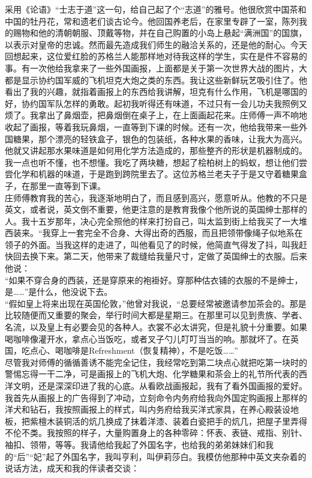 采用《论语》“士志于道”这一句，给自己起了个“志道”的雅号。他很欣赏中国茶和中国的牡丹花，常和遗老们谈古论今。他回国养老后，在家里专辟了一室，陈列我的赐物和他的清朝朝服、顶戴等物，并在自己购置的小岛上悬起“满洲国”的国旗，以表示对皇帝的忠诚。然而最先造成我们师生的融洽关系的，还是他的耐心。今天回想起来，这位爱红脸的苏格兰人能那样地对待我这样的学生，实在是件不容易的事。有一次他给我拿来了一些外国画报，上面都是关于第一次世界大战的图片，大都是显示协约国军威的飞机坦克大炮之类的东西。我让这些新鲜玩艺吸引住了。他看出了我的兴趣，就指着画报上的东西给我讲解，坦克有什么作用，飞机是哪国的好，协约国军队怎样的勇敢。起初我听得还有味道，不过只有一会儿功夫我照例又烦了。我拿出了鼻烟壶，把鼻烟倒在桌子上，在上面画起花来。庄师傅一声不响地收起了画报，等着我玩鼻烟，一直等到下课的时候。还有一次，他给我带来一些外国糖果，那个漂亮的轻铁盒子，银色的包装纸，各种水果的香味，让我大为高兴。他就又讲起那水果味道是如何用化学方法造成的，那些整齐的形状是机器制成的。我一点也听不懂，也不想懂。我吃了两块糖，想起了桧柏树上的蚂蚁，想让他们尝尝化学和机器的味道，于是跑到跨院里去了。这位苏格兰老夫子于是又守着糖果盒子，在那里一直等到下课。\\

庄师傅教育我的苦心，我逐渐地明白了，而且感到高兴，愿意听从。他教的不只是英文，或者说，英文倒不重要，他更注意的是教育我像个他所说的英国绅士那样的人。我十五岁那年，决心完全照他的样来打扮自己，叫太监到街上给我买了一大堆西装来。“我穿上一套完全不合身、大得出奇的西服，而且把领带像绳子似地系在领子的外面。当我这样的走进了，叫他看见了的时候，他简直气得发了抖，叫我赶快回去换下来。第二天，他带来了裁缝给我量尺寸，定做了英国绅士的衣服。后来他说：\\

“如果不穿合身的西装，还是穿原来的袍褂好。穿那种估衣铺的衣服的不是绅士，是……”是什么，他没说下去。\\

“假如皇上将来出现在英国伦敦，”他曾对我说，“总要经常被邀请参加茶会的。那是比较随便而又重要的聚会，举行时间大都是星期三。在那里可以见到贵族、学者、名流，以及皇上有必要会见的各种人。衣裳不必太讲究，但是礼貌十分重要。如果喝咖啡像灌开水，拿点心当饭吃，或者叉子勺儿叮叮当当的响。那就坏了。在英国，吃点心、喝咖啡是Refreshment（恢复精神），不是吃饭……”\\

尽管我对师傅的循循善诱不能完全记住，我经常吃到第二块点心就把吃第一块时的警惕忘得一干二净，可是画报上的飞机大炮、化学糖果和茶会上的礼节所代表的西洋文明，还是深深印进了我的心底。从看欧战画报起，我有了看外国画报的爱好。我首先从画报上的广告得到了冲动，立刻命令内务府给我向外国定购画报上那样的洋犬和钻石，我按照画报上的样式，叫内务府给我买洋式家具，在养心殿装设地板，把紫檀木装铜活的炕几换成了抹着洋漆、装着白瓷把手的炕几，把屋子里弄得不伦不类。我按照的样子，大量购置身上的各种零碎：怀表、表链、戒指、别针、袖扣、领带，等等。我请他给我起了外国名字，也给我的弟弟妹妹们和我的“后”“妃”起了外国名字，我叫亨利，叫伊莉莎白。我模仿他那种中英文夹杂着的说话方法，成天和我的伴读者交谈：\\

